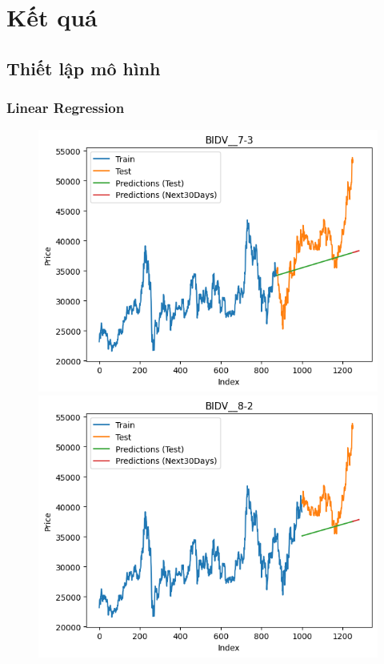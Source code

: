 \section{Kết quá}

\subsection{Thiết lập mô hình} 
\subsubsection{Linear Regression}
\begin{figure}[H]
    \centering
    \begin{minipage}{0.15\textwidth}
    \centering
    \includegraphics[width=1\textwidth]{resources/chapter-5/result/BIDV_LinearRegression_7-3.png}
    \end{minipage}
    \hfill
    \begin{minipage}{0.15\textwidth}
    \centering
    \includegraphics[width=1\textwidth]{resources/chapter-5/result/BIDV_LinearRegression_8-2.png}

\end{minipage}
\end{figure}
